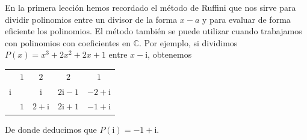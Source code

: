 \begin{ejemplo}
En la primera lección hemos recordado el método de Ruffini que nos sirve para dividir polinomios entre un divisor
de la forma $x-a$ y para evaluar de forma eficiente los polinomios.
El método también se puede utilizar cuando trabajamos con polinomios con coeficientes en $\mathbb{C}$.
Por ejemplo, si dividimos $P(x)=x^3+2x^2+2x+1$ entre $x-\mathrm{i}$, obtenemos
\begin{center}
\begin{tabular}{r|cccc}
    & $1$ & $2$     & $2$      & $1$  \\
$\mathrm{i}$ &   & $\mathrm{i}$   & $2\mathrm{i}-1$ & $-2+\mathrm{i}$ \\\hline
    & $1$ & $2+\mathrm{i}$ & $2\mathrm{i}+1$ & \multicolumn{1}{|r}{$-1+\mathrm{i}$} \\ \cline{5-5}
\end{tabular}
\end{center}
De donde deducimos que $P(\mathrm{i})=-1+\mathrm{i}$.\fej
\end{ejemplo}


